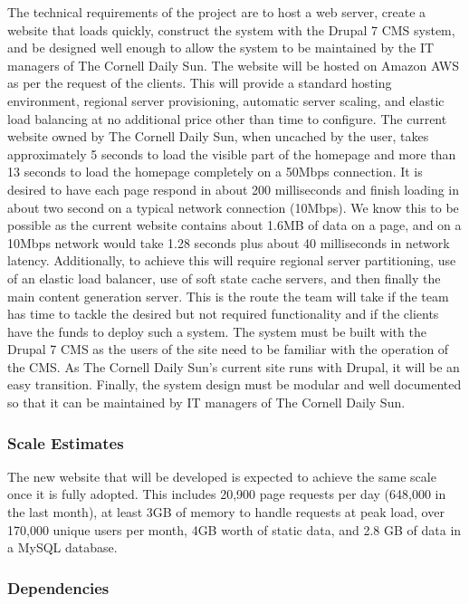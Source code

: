 \documentclass[10pt]{article} %
\begin{document}
The technical requirements of the project are to host a web server, create a website that loads quickly, construct the system with the Drupal 7 CMS system, and be designed well enough to allow the system to be maintained by the IT managers of The Cornell Daily Sun. The website will be hosted on Amazon AWS as per the request of the clients. This will provide a standard hosting environment, regional server provisioning, automatic server scaling, and elastic load balancing at no additional price other than time to configure. The current website owned by The Cornell Daily Sun, when uncached by the user, takes approximately 5 seconds to load the visible part of the homepage and more than 13 seconds to load the homepage completely on a 50Mbps connection. It is desired to have each page respond in about 200 milliseconds and finish loading in about two second on a typical network connection (10Mbps). We know this to be possible as the current website contains about 1.6MB of data on a page, and on a 10Mbps network would take 1.28 seconds plus about 40 milliseconds in network latency. Additionally, to achieve this will require regional server partitioning, use of an elastic load balancer, use of soft state cache servers, and then finally the main content generation server. This is the route the team will take if the team has time to tackle the desired but not required functionality and if the clients have the funds to deploy such a system. The system must be built with the Drupal 7 CMS as the users of the site need to be familiar with the operation of the CMS. As The Cornell Daily Sun’s current site runs with Drupal, it will be an easy transition. Finally, the system design must be modular and well documented so that it can be maintained by IT managers of The Cornell Daily Sun.

\subsubsection{Scale Estimates}

The new website that will be developed is expected to achieve the same scale once it is fully adopted. This includes 20,900 page requests per day (648,000 in the last month), at least 3GB of memory to handle requests at peak load, over 170,000 unique users per month, 4GB worth of static data, and 2.8 GB of data in a MySQL database.

\subsubsection{Dependencies}
\end{document}

